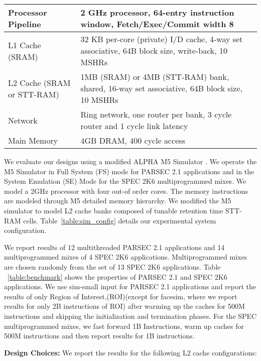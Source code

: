 \begin {table*} [t]
 \scriptsize
  \centering
 \caption {{Baseline processor, cache, memory and network configuration}} \label{table:sim_config}
 \begin{tabular}{|l|l|}
 \hline
Processor Pipeline & 2 GHz processor, 64-entry instruction window, Fetch/Exec/Commit width 8 \\
\hline
L1 Cache (SRAM) & 32 KB per-core (private) I/D cache, 4-way set associative, 64B block size, write-back, 10 MSHRs \\
\hline
L2 Cache (SRAM or STT-RAM) &  1MB (SRAM) or 4MB (STT-RAM) bank, shared, 16-way set associative, 64B block size, 10 MSHRs \\
\hline
Network & Ring network, one router per bank, 3 cycle router and 1 cycle link latency \\
\hline
Main Memory & 4GB DRAM, 400 cycle access \\
\hline
\end{tabular}
\end{table*}

We evaluate our designs using a modified ALPHA M5 Simulator \cite{M5} .
We operate the M5 Simulator in Full System (FS) mode for PARSEC 2.1 applications and in the System Emulation (SE) Mode
for the SPEC 2K6 multiprogrammed mixes. We model a 2GHz processor with four out-of order cores.
The memory instructions are modeled through M5 detailed memory hierarchy. We modified the M5 simulator to model
L2 cache banks composed of tunable retention time STT-RAM cells. Table~\ref{table:sim_config} details our experimental system configuration.

We report results of 12 multithreaded PARSEC 2.1 applications and 14 multiprogrammed mixes of 4 SPEC 2K6 applications.
Multiprogrammed mixes are chosen randomly from the set of 13 SPEC 2K6 applications.
Table ~\ref{table:benchmark} shows the properties of PARSEC 2.1 and SPEC 2K6 applications.
We use sim-small input for PARSEC 2.1 applications and report the results of only Region of Interest,(ROI)(except for facesim, where we report results for only 2B instructions of ROI)
after warming up the caches for 500M instructions and skipping the initialization and termination phases. For the SPEC multiprogrammed mixes,
we fast forward 1B Instructions, warm up caches for 500M instructions and then report
results for 1B instructions.

\noindent\textbf{Design Choices:}
We report the results for the following L2 cache configurations:


